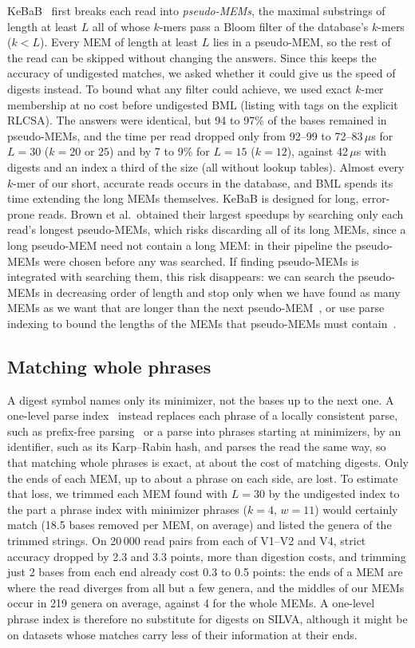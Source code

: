 KeBaB~\cite{BrownEtAl2025KeBaB} first breaks each read into \emph{pseudo-MEMs}, the maximal substrings of length at least $L$ all of whose $k$-mers pass a Bloom filter of the database's $k$-mers ($k < L$).
Every MEM of length at least $L$ lies in a pseudo-MEM, so the rest of the read can be skipped without changing the answers.
Since this keeps the accuracy of undigested matches, we asked whether it could give us the speed of digests instead.
To bound what any filter could achieve, we used exact $k$-mer membership at no cost before undigested BML (listing with tags on the explicit RLCSA).
The answers were identical, but 94 to 97\% of the bases remained in pseudo-MEMs, and the time per read dropped only from 92--99 to 72--83\,$\mu$s for $L = 30$ ($k = 20$ or $25$) and by 7 to 9\% for $L = 15$ ($k = 12$), against 42\,$\mu$s with digests and an index a third of the size (all without lookup tables).
Almost every $k$-mer of our short, accurate reads occurs in the database, and BML spends its time extending the long MEMs themselves.
KeBaB is designed for long, error-prone reads.
Brown et al.\ obtained their largest speedups by searching only each read's longest pseudo-MEMs, which risks discarding all of its long MEMs, since a long pseudo-MEM need not contain a long MEM: in their pipeline the pseudo-MEMs were chosen before any was searched.
If finding pseudo-MEMs is integrated with searching them, this risk disappears: we can search the pseudo-MEMs in decreasing order of length and stop only when we have found as many MEMs as we want that are longer than the next pseudo-MEM~\cite{BrownEtAl2025KeBaB}, or use parse indexing to bound the lengths of the MEMs that pseudo-MEMs must contain~\cite{Gagie2026pseudo}.

\subsection{Matching whole phrases}

A digest symbol names only its minimizer, not the bases up to the next one.
A one-level parse index~\cite{HongEtAl2024,BrownEtAlRLCSA,Gagie2026pseudo} instead replaces each phrase of a locally consistent parse, such as prefix-free parsing~\cite{BoucherEtAl2019} or a parse into phrases starting at minimizers, by an identifier, such as its Karp--Rabin hash, and parses the read the same way, so that matching whole phrases is exact, at about the cost of matching digests.
Only the ends of each MEM, up to about a phrase on each side, are lost.
To estimate that loss, we trimmed each MEM found with $L = 30$ by the undigested index to the part a phrase index with minimizer phrases ($k = 4$, $w = 11$) would certainly match (18.5 bases removed per MEM, on average) and listed the genera of the trimmed strings.
On 20\,000 read pairs from each of V1--V2 and V4, strict accuracy dropped by 2.3 and 3.3 points, more than digestion costs, and trimming just 2 bases from each end already cost 0.3 to 0.5 points: the ends of a MEM are where the read diverges from all but a few genera, and the middles of our MEMs occur in 219 genera on average, against 4 for the whole MEMs.
A one-level phrase index is therefore no substitute for digests on SILVA, although it might be on datasets whose matches carry less of their information at their ends.
